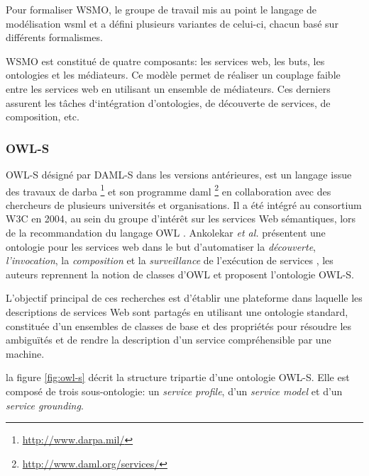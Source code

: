     Pour formaliser \textsc{WSMO}, le groupe de travail mis au point
    le langage de modélisation \acrshort{wsml} \cite{de2006web} et a
    défini plusieurs variantes de celui-ci, chacun basé sur différents
    formalismes.

    \textsc{WSMO} est constitué de quatre composants: les services
    web, les buts, les ontologies et les médiateurs. Ce modèle permet
    de réaliser un couplage faible entre les services web en utilisant
    un ensemble de médiateurs. Ces derniers assurent les tâches
    d‘intégration d'ontologies, de découverte de services, de
    composition, etc.

    \subsubsection{OWL-S}
    \label{sec:owl-s-1}

    \textsc{OWL-S} \cite{martin2004owl} désigné par \textsc{DAML-S}
    \cite{ankolekar2002daml} dans les versions antérieures, est un
    langage issue des travaux de \acrshort{darba}
    \footnote{\url{http://www.darpa.mil/}} et son programme
    \acrshort{daml} \footnote{\url{http://www.daml.org/services/}} en
    collaboration avec des chercheurs de plusieurs universités et
    organisations. Il a été intégré au consortium \textsc{W3C} en
    2004, au sein du groupe d'intérêt sur les services Web
    sémantiques, lors de la recommandation du langage \textsc{OWL}
    \cite{horrocks2002daml+oil, mcguinness2004owl}. Ankolekar \emph{et
      al.}  \cite{ankolekar2002daml} présentent une ontologie pour les
    services web dans le but d'automatiser la \emph{découverte},
    \emph{l'invocation}, la \emph{composition} et la
    \emph{surveillance} de l'exécution de services
    \cite{mcilraith2003bringing}, les auteurs reprennent la notion de
    classes d'\textsc{OWL} et proposent l'ontologie \textsc{OWL-S}.
    

    L'objectif principal de ces recherches est d'établir une
    plateforme dans laquelle les descriptions de services Web sont
    partagés en utilisant une ontologie standard, constituée d'un
    ensembles de classes de base et des propriétés pour résoudre les
    ambiguïtés et de rendre la description d'un service compréhensible
    par une machine.

    la figure \ref{fig:owl-s} décrit la structure tripartie d'une
    ontologie \textsc{OWL-S}. Elle est composé de trois
    sous-ontologie: un \emph{service profile}, d'un \emph{service
      model} et d'un \emph{service grounding}.


